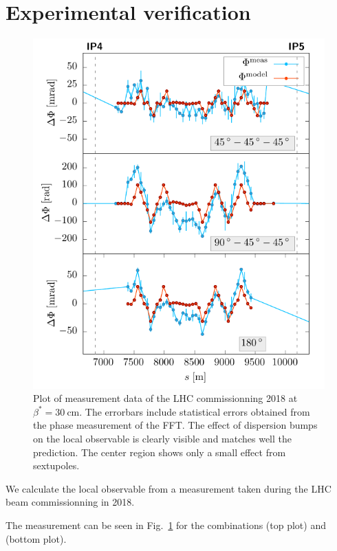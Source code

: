 \section{Experimental verification}
\label{sec:measurements}

\begin{figure}[t]
  \centering
  \includegraphics[width=.6\linewidth]{meas}
  \caption{Plot of measurement data of the LHC commissionning 2018 at $\beta^*=\SI{30}{\centi\metre}$.
    The errorbars include statistical errors
    obtained from the phase measurement of the FFT.
    The effect of dispersion bumps on the local observable is clearly visible and matches well the
    prediction. The center region shows only a small effect from sextupoles.
  }
  \label{fig_measlobster002}
\end{figure}

We calculate the local observable from a measurement taken during the LHC beam commissionning in 2018.

The measurement can be seen in Fig.~\ref{fig_measlobster002} for the combinations 
(top plot) and  (bottom plot).

